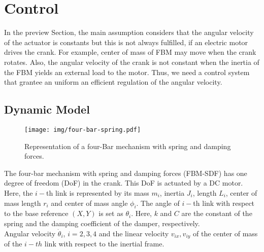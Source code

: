 \documentclass[12pt,letterpape]{article}
\begin{document}
		

\section{Control} %
\label{sec:control}

In the preview Section, the main assumption considers that the angular velocity
of the actuator is constants but this is not always fulfilled, if an electric motor
drives the crank. For example, center of mass of FBM may move when the crank rotates.
Also, the angular velocity of the crank is not constant when the inertia of the 
FBM yields an external load to the motor. Thus, we need a control system that grantee 
an uniform an efficient regulation of the angular velocity.

\subsection{Dynamic Model} %
\label{sub:dynamic_model}

\begin{figure}[!ht]
	\centering
	\texttt{[image: img/four-bar-spring.pdf]}
	\caption{Representation of a four-Bar mechanism with spring and damping forces.}
\end{figure}

The four-bar mechanism with spring and damping forces (FBM-SDF) has one degree of
freedom (DoF) in the crank. This DoF is actuated by a DC motor. Here, the $i-$th link is represented by its mass $m_i$, inertia $J_i$, length $L_i$, center of mass
length $r_i$ and center of mass angle $\phi_i$. The angle of $i-$th link with respect to the base reference $(X, Y)$ is set as $\theta_i$. Here, $k$ and $C$ are the constant
of the spring and the damping coefficient of the damper, respectively.\\

Angular velocity $\dot{\theta}_i$, $ i = 2,3,4$ and the linear velocity $v_{ix},v_{iy}$
of the center of mass of the $i-th$ link with respect to the inertial frame.
\end{document}
